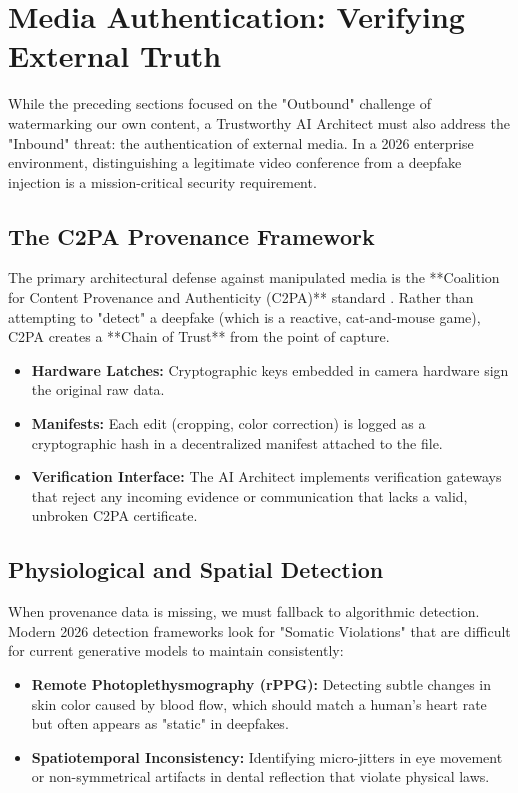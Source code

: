 \section{Media Authentication: Verifying External Truth}
\label{sec:media_authentication}

While the preceding sections focused on the "Outbound" challenge of watermarking our own content, a Trustworthy AI Architect must also address the "Inbound" threat: the authentication of external media. In a 2026 enterprise environment, distinguishing a legitimate video conference from a deepfake injection is a mission-critical security requirement.

\subsection{The C2PA Provenance Framework}
The primary architectural defense against manipulated media is the **Coalition for Content Provenance and Authenticity (C2PA)** standard \cite{cisa2021}. Rather than attempting to "detect" a deepfake (which is a reactive, cat-and-mouse game), C2PA creates a **Chain of Trust** from the point of capture.
\begin{itemize}
    \item \textbf{Hardware Latches:} Cryptographic keys embedded in camera hardware sign the original raw data.
    \item \textbf{Manifests:} Each edit (cropping, color correction) is logged as a cryptographic hash in a decentralized manifest attached to the file.
    \item \textbf{Verification Interface:} The AI Architect implements verification gateways that reject any incoming evidence or communication that lacks a valid, unbroken C2PA certificate.
\end{itemize}

\subsection{Physiological and Spatial Detection}
When provenance data is missing, we must fallback to algorithmic detection. Modern 2026 detection frameworks look for "Somatic Violations" that are difficult for current generative models to maintain consistently:
\begin{itemize}
    \item \textbf{Remote Photoplethysmography (rPPG):} Detecting subtle changes in skin color caused by blood flow, which should match a human's heart rate but often appears as "static" in deepfakes.
    \item \textbf{Spatiotemporal Inconsistency:} Identifying micro-jitters in eye movement or non-symmetrical artifacts in dental reflection that violate physical laws.
\end{itemize}

